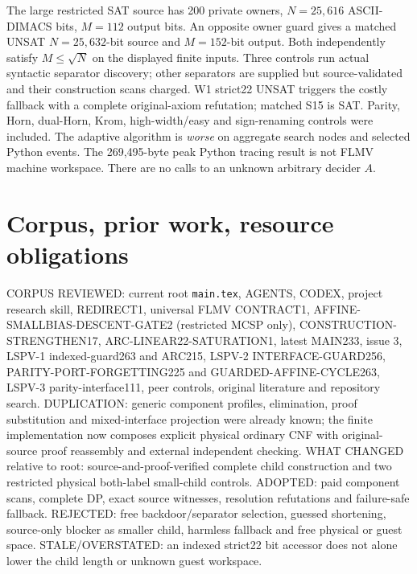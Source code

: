 \documentclass[11pt]{article}
\begin{document}
The large restricted SAT source has 200 private owners, $N=25,616$ ASCII-DIMACS bits, $M=112$ output bits. An opposite owner guard gives a matched UNSAT $N=25,632$-bit source and $M=152$-bit output. Both independently satisfy $M\le\sqrt N$ on the displayed finite inputs. Three controls run actual syntactic separator discovery; other separators are supplied but source-validated and their construction scans charged. W1 strict22 UNSAT triggers the costly fallback with a complete original-axiom refutation; matched S15 is SAT. Parity, Horn, dual-Horn, Krom, high-width/easy and sign-renaming controls were included. The adaptive algorithm is \emph{worse} on aggregate search nodes and selected Python events. The 269,495-byte peak Python tracing result is not FLMV machine workspace. There are no calls to an unknown arbitrary decider $A$.
\section{Corpus, prior work, resource obligations}
CORPUS REVIEWED: current root \texttt{main.tex}, AGENTS, CODEX, project research skill, REDIRECT1, universal FLMV CONTRACT1, AFFINE-SMALLBIAS-DESCENT-GATE2 (restricted MCSP only), CONSTRUCTION-STRENGTHEN17, ARC-LINEAR22-SATURATION1, latest MAIN233, issue 3, LSPV-1 indexed-guard263 and ARC215, LSPV-2 INTERFACE-GUARD256, PARITY-PORT-FORGETTING225 and GUARDED-AFFINE-CYCLE263, LSPV-3 parity-interface111, peer controls, original literature and repository search. DUPLICATION: generic component profiles, elimination, proof substitution and mixed-interface projection were already known; the finite implementation now composes explicit physical ordinary CNF with original-source proof reassembly and external independent checking. WHAT CHANGED relative to root: source-and-proof-verified complete child construction and two restricted physical both-label small-child controls. ADOPTED: paid component scans, complete DP, exact source witnesses, resolution refutations and failure-safe fallback. REJECTED: free backdoor/separator selection, guessed shortening, source-only blocker as smaller child, harmless fallback and free physical or guest space. STALE/OVERSTATED: an indexed strict22 bit accessor does not alone lower the child length or unknown guest workspace.
\end{document}
